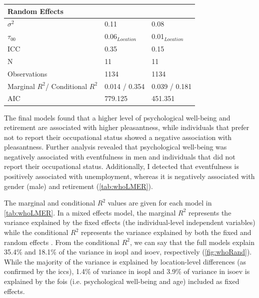 {\begin{landscape}
\begin{table}[ht]
\begin{tabular}{@{}lcccccc@{}}
  \midrule
  \multicolumn{7}{l}{\textbf{Random Effects}} \\ 
  \midrule
  $\sigma^2$         & \multicolumn{3}{l|}{0.11}               & \multicolumn{3}{l}{0.08}              \\
  $\tau_{00}$        & \multicolumn{3}{l|}{0.06$_{Location}$}  & \multicolumn{3}{l}{0.01$_{Location}$} \\
  ICC                & \multicolumn{3}{l|}{0.35}               & \multicolumn{3}{l}{0.15}              \\
  N                  & \multicolumn{3}{l|}{11}                 & \multicolumn{3}{l}{11}                \\
  \midrule
  Observations       & \multicolumn{3}{l|}{1134}               & \multicolumn{3}{l}{1134}          \\
  Marginal $R^2$/%
  Conditional $R^2$  & \multicolumn{3}{l|}{0.014 / 0.354}      & \multicolumn{3}{l}{0.039 / 0.181} \\
  AIC                & \multicolumn{3}{l|}{779.125}            & \multicolumn{3}{l}{451.351}       \\
  \bottomrule
  \end{tabular}
  \end{table}
  \end{landscape}
}

  The final models found that a higher level of psychological well-being and retirement are associated with higher pleasantness, while individuals that prefer not to report their occupational status showed a negative association with pleasantness. Further analysis revealed that psychological well-being was negatively associated with eventfulness in men and individuals that did not report their occupational status. Additionally, I detected that eventfulness is positively associated with unemployment, whereas it is negatively associated with gender (male) and retirement (\cref{tab:whoLMER}). 

  The marginal and conditional $R^2$ values are given for each model in \cref{tab:whoLMER}. In a mixed effects model, the marginal $R^2$ represents the variance explained by the fixed effects (the individual-level independent variables) while the conditional $R^2$ represents the variance explained by both the fixed and random effects \citep{Nakagawa2012general}. From the conditional $R^2$, we can say that the full models explain 35.4\% and 18.1\% of the variance in \gls{isopl} and \gls{isoev}, respectively (\cref{fig:whoRand}). While the majority of the variance is explained by location-level differences (as confirmed by the \glspl{icc}), 1.4\% of variance in \gls{isopl} and 3.9\% of variance in \gls{isoev} is explained by the \glspl{foi} (i.e. psychological well-being and age) included as fixed effects.

